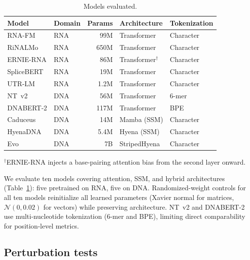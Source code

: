 \documentclass[11pt]{article}
\begin{document}
\begin{table}[htbp]
\centering
\caption{Models evaluated.}
\label{tab:models}
\begin{tabular}{@{}llrll@{}}
\toprule
\textbf{Model} & \textbf{Domain} & \textbf{Params} & \textbf{Architecture} & \textbf{Tokenization} \\
\midrule
RNA-FM \citep{rnafm}                    & RNA & 99M  & Transformer           & Character \\
RiNALMo \citep{rinalmo}                 & RNA & 650M & Transformer           & Character \\
ERNIE-RNA \citep{yin2024ernierna}        & RNA & 86M  & Transformer$^\dagger$ & Character \\
SpliceBERT \citep{chen2024splicebert}     & RNA & 19M  & Transformer           & Character \\
UTR-LM \citep{chu2024utrlm}             & RNA & 1.2M & Transformer           & Character \\
NT~v2 \citep{dalla2023nucleotide}        & DNA & 56M  & Transformer           & 6-mer     \\
DNABERT-2 \citep{zhou2024dnabert2}       & DNA & 117M & Transformer           & BPE       \\
Caduceus \citep{schiff2024caduceus}      & DNA & 14M  & Mamba (SSM)           & Character \\
HyenaDNA \citep{nguyen2024hyenadna}      & DNA & 5.4M & Hyena (SSM)           & Character \\
Evo \citep{nguyen2024evo}                & DNA & 7B   & StripedHyena          & Character \\
\bottomrule
\end{tabular}
\medskip

\small $^\dagger$ERNIE-RNA injects a base-pairing attention bias from the
second layer onward.
\end{table}

We evaluate ten models covering attention, SSM, and hybrid architectures
(Table~\ref{tab:models}): five pretrained on RNA, five on DNA.
Randomized-weight controls for all ten models reinitialize all
learned parameters (Xavier normal for matrices, $\mathcal{N}(0, 0.02)$
for vectors) while preserving architecture. NT~v2 and DNABERT-2 use
multi-nucleotide tokenization (6-mer and BPE), limiting direct
comparability for position-level metrics.

\subsection{Perturbation tests}
\label{sec:perturbation}
\end{document}
